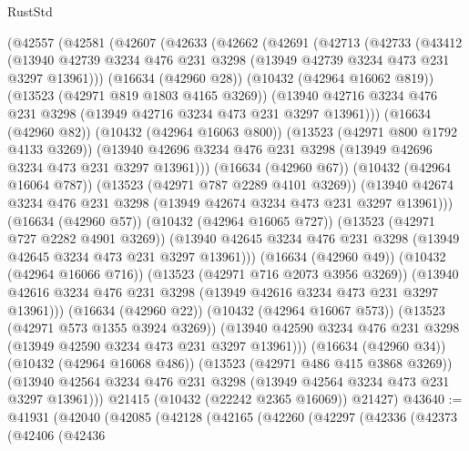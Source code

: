 \begin{lexlean}{RustStd}
\begin{coremodule}
    (@42557
      (@42581
        (@42607
          (@42633
            (@42662
              (@42691
                (@42713
                  (@42733
                    (@43412
                      (@13940
                        @42739
                        @3234
                        @476
                        @231
                        @3298
                        (@13949 @42739 @3234 @473 @231 @3297 @13961)))
                    (@16634 (@42960 @28))
                    (@10432 (@42964 @16062 @819))
                    (@13523 (@42971 @819 @1803 @4165 @3269))
                    (@13940
                      @42716
                      @3234
                      @476
                      @231
                      @3298
                      (@13949 @42716 @3234 @473 @231 @3297 @13961)))
                  (@16634 (@42960 @82))
                  (@10432 (@42964 @16063 @800))
                  (@13523 (@42971 @800 @1792 @4133 @3269))
                  (@13940
                    @42696
                    @3234
                    @476
                    @231
                    @3298
                    (@13949 @42696 @3234 @473 @231 @3297 @13961)))
                (@16634 (@42960 @67))
                (@10432 (@42964 @16064 @787))
                (@13523 (@42971 @787 @2289 @4101 @3269))
                (@13940 @42674 @3234 @476 @231 @3298 (@13949 @42674 @3234 @473 @231 @3297 @13961)))
              (@16634 (@42960 @57))
              (@10432 (@42964 @16065 @727))
              (@13523 (@42971 @727 @2282 @4901 @3269))
              (@13940 @42645 @3234 @476 @231 @3298 (@13949 @42645 @3234 @473 @231 @3297 @13961)))
            (@16634 (@42960 @49))
            (@10432 (@42964 @16066 @716))
            (@13523 (@42971 @716 @2073 @3956 @3269))
            (@13940 @42616 @3234 @476 @231 @3298 (@13949 @42616 @3234 @473 @231 @3297 @13961)))
          (@16634 (@42960 @22))
          (@10432 (@42964 @16067 @573))
          (@13523 (@42971 @573 @1355 @3924 @3269))
          (@13940 @42590 @3234 @476 @231 @3298 (@13949 @42590 @3234 @473 @231 @3297 @13961)))
        (@16634 (@42960 @34))
        (@10432 (@42964 @16068 @486))
        (@13523 (@42971 @486 @415 @3868 @3269))
        (@13940 @42564 @3234 @476 @231 @3298 (@13949 @42564 @3234 @473 @231 @3297 @13961)))
      @21415
      (@10432 (@22242 @2365 @16069))
      @21427)
@43640 := @41931
    (@42040
      (@42085
        (@42128
          (@42165
            (@42260
              (@42297
                (@42336
                  (@42373
                    (@42406
                      (@42436

\end{coremodule}
\end{lexlean}
